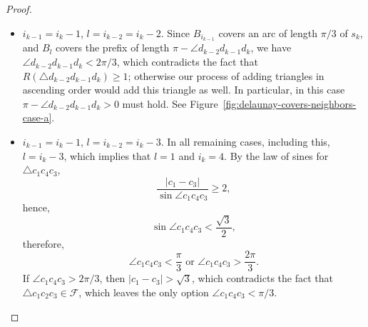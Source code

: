 \begin{appendices}
\begin{proof}
\begin{itemize}
    \item $i_{k-1} = i_k - 1$, $l = i_{k-2} = i_k - 2$. Since $B_{i_{k-1}}$ covers an arc of length $\pi/3$ of $s_k$, and $B_l$ covers the prefix of length $\pi - \angle{d_{k-2}d_{k-1}d_k}$, we have $\angle{d_{k-2}d_{k-1}d_k} < 2\pi/3$, which contradicts the fact that $R(\triangle d_{k-2}d_{k-1}d_k)\geq 1$; otherwise our process of adding triangles in ascending order would add this triangle as well. In particular, in this case $\pi - \angle{d_{k-2}d_{k-1}d_k} > 0$ must hold. See Figure~\ref{fig:delaunay-covers-neighbors-case-a}.
    \item $i_{k-1} = i_k - 1$, $l = i_{k-2} = i_k - 3$. In all remaining cases, including this, $l = i_k - 3$, which implies that $l = 1$ and $i_k = 4$. By the law of sines for $\triangle c_1c_4c_3$,
    $$\frac{|c_1 - c_3|}{\sin\angle c_1c_4c_3}\geq 2,$$
    hence,
    $$\sin\angle c_1c_4c_3 < \frac{\sqrt{3}}{2},$$
    therefore,
    $$\angle c_1c_4c_3 < \frac{\pi}{3}\text{ or }\angle c_1c_4c_3 > \frac{2\pi}{3}.$$
    If $\angle{c_1c_4c_3} > 2\pi/3$, then $|c_1 - c_3| > \sqrt{3}$, which contradicts the fact that $\triangle c_1c_2c_3\in\mathcal{F}$, which leaves the only option $\angle c_1c_4c_3 < \pi/3$.
    

\end{itemize}
\end{proof}
\end{appendices}
